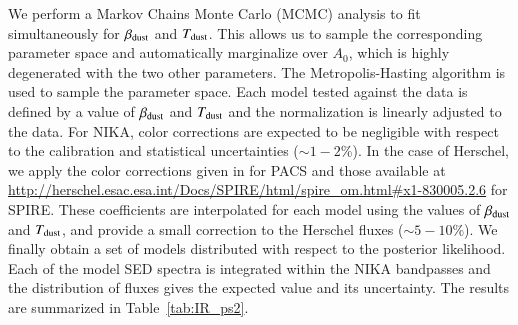 \documentclass[twocolumn,traditabstract]{aa}
\begin{document}
We perform a Markov Chains Monte Carlo (MCMC) analysis to fit simultaneously for $\beta_{\rm dust}$ and $T_{\rm dust}$. This allows us to sample the corresponding parameter space and automatically marginalize over $A_0$, which is highly degenerated with the two other parameters. The Metropolis-Hasting algorithm is used to sample the parameter space. Each model tested against the data is defined by a value of $\beta_{\rm dust}$ and $T_{\rm dust}$ and the normalization is linearly adjusted to the data. For NIKA, color corrections are expected to be negligible with respect to the calibration and statistical uncertainties ($\sim 1-2$\%). In the case of Herschel, we apply the color corrections given in \cite{poglitsch2010} for PACS and those available at \url{http://herschel.esac.esa.int/Docs/SPIRE/html/spire_om.html\#x1-830005.2.6} for SPIRE. These coefficients are interpolated for each model using the values of $\beta_{\rm dust}$ and $T_{\rm dust}$, and provide a small correction to the Herschel fluxes ($\sim 5-10$\%). We finally obtain a set of models distributed with respect to the posterior likelihood. Each of the model SED spectra is integrated within the NIKA bandpasses and the distribution of fluxes gives the expected value and its uncertainty. The results are summarized in Table~\ref{tab:IR_ps2}.
\end{document}
